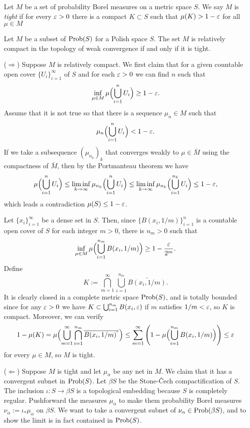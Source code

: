 \documentclass[a4paper]{article}
\begin{document}
\begin{defn}
Let $M$ be a set of probability Borel measures on a metric space $S$.
We say $M$ is \emph{tight} if for every $\varepsilon>0$ there is a compact $K\subset S$ such that $\mu(K)>1-\varepsilon$ for all $\mu\in M$
\end{defn}
\begin{thm}
Let $M$ be a subset of $\operatorname{Prob}(S)$ for a Polish space $S$.
The set $M$ is relatively compact in the topology of weak convergence if and only if it is tight.
\end{thm}
\begin{pf}
($\Rightarrow$)
Suppose $M$ is relatively compact.
We first claim that for a given countable open cover $\{U_i\}_{i=1}^\infty$ of $S$ and for each $\varepsilon>0$ we can find $n$ such that
\[\inf_{\mu\in M}\mu\Bigl(\bigcup_{i=1}^nU_i\Bigr)\ge1-\varepsilon.\]
Assume that it is not true so that there is a sequence $\mu_n\in M$ such that
\[\mu_n\Bigl(\bigcup_{i=1}^nU_i\Bigr)<1-\varepsilon.\]
If we take a subsequence $(\mu_{n_k})_k$ that converges weakly to $\mu\in\bar M$ using the compactness of $\bar M$, then by the Portmanteau theorem we have
\[\mu\Bigl(\bigcup_{i=1}^nU_i\Bigr)\le\liminf_{k\to\infty}\mu_{n_k}\Bigl(\bigcup_{i=1}^nU_i\Bigr)\le\liminf_{k\to\infty}\mu_{n_k}\Bigl(\bigcup_{i=1}^{n_k}U_i\Bigr)\le1-\varepsilon,\]
which leads a contradiction $\mu(S)\le1-\varepsilon$.

Let $\{x_i\}_{i=1}^\infty$ be a dense set in $S$.
Then, since $\{B(x_i,1/m)\}_{i=1}^n$ is a countable open cover of $S$ for each integer $m>0$, there is $n_m>0$ such that
\[\inf_{\mu\in M}\mu\Bigl(\bigcup_{i=1}^{n_m}B(x_i,1/m)\Bigr)\ge1-\frac{\varepsilon}{2^m}.\]
Define
\[K:=\bigcap_{m=1}^\infty\bigcup_{i=1}^{n_m}\bar{B(x_i,1/m)}.\]
It is clearly closed in a complete metric space $\operatorname{Prob}(S)$, and is totally bounded since for any $\varepsilon>0$ we have $K\subset\bigcup_{i=1}^{n_m}B(x_i,\varepsilon)$ if $m$ satisfies $1/m<\varepsilon$, so $K$ is compact.
Moreover, we can verify
\[1-\mu(K)=\mu\Bigl(\bigcup_{m=1}^\infty\bigcap_{i=1}^{n_m}\overline{B(x_i,1/m)}^c\Bigr)\le\sum_{m=1}^\infty\left(1-\mu\Bigl(\bigcup_{i=1}^{n_m}B(x_i,1/m)\Bigr)\right)\le\varepsilon\]
for every $\mu\in M$, so $M$ is tight.

($\Leftarrow$)
Suppose $M$ is tight and let $\mu_\alpha$ be any net in $M$.
We claim that it has a convergent subnet in $\operatorname{Prob}(S)$.
Let $\beta S$ be the Stone-\v Cech compactification of $S$.
The inclusion $\iota:S\to\beta S$ is a topological embedding because $S$ is completely regular.
Pushforward the measures $\mu_\alpha$ to make them probability Borel measures $\nu_\alpha:=\iota_*\mu_\alpha$ on $\beta S$.
We want to take a convergent subnet of $\nu_\alpha\in\operatorname{Prob}(\beta S)$, and to show the limit is in fact contained in $\operatorname{Prob}(S)$.


\end{pf}
\end{document}
